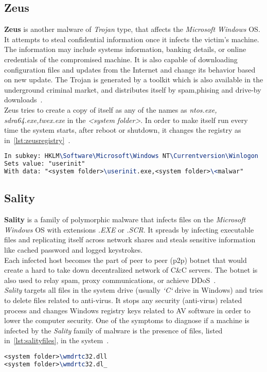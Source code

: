\subsection{Zeus}
\label{sub:Zeus}
\textbf{Zeus} is another malware of \emph{Trojan} type, that affects the \emph{Microsoft Windows} OS\@.
It attempts to steal confidential information once it infects the victim's machine.
The information may include systems information, banking details, or online credentials of the compromised machine.
It is also capable of downloading configuration files and updates from the Internet and change its behavior based on new update.
The Trojan is generated by a toolkit which is also available in the underground criminal market, and distributes itself by spam,phising and drive-by downloads~\cite[Trojan.Zbot]{zeus}.\\
Zeus tries to create a copy of itself as any of the names as \emph{ntos.exe, sdra64.exe,twex.exe} in the \textit{<system folder>}.
In order to make itself run every time the system starts, after reboot or shutdown, it changes the registry as in~\autoref{lst:zeusregistry}~\cite[Win32/Zbot]{zeusmicro}.
\begin{lstlisting}[language=TeX,caption={Registry key modified by Zeus Trojan to autostart},label={lst:zeusregistry}]
In subkey: HKLM\Software\Microsoft\Windows NT\Currentversion\Winlogon
Sets value: "userinit"
With data: "<system folder>\userinit.exe,<system folder>\<malwar"
\end{lstlisting}
\subsection{Sality}
\label{sub:Sality}
\textbf{Sality} is a family of polymorphic malware that infects files on the \emph{Microsoft Windows} OS with extensions \emph{.EXE} or \emph{.SCR}.
It spreads by infecting executable files and replicating itself across network shares and steals sensitive information like cached password and logged keystrokes.\\
Each infected host becomes the part of peer to peer (p2p) botnet that would create a hard to take down decentralized network of C\&C servers.
The botnet is also used to relay spam, proxy communications, or achieve DDoS~\cite[Sality]{salitysym}.\\
\emph{Sality} targets all files in the system drive (usually \emph{`C`} drive in Windows) and tries to delete files related to anti-virus.
It stops any security (anti-virus) related process  and changes Windows registry keys related to AV software in order to lower the computer security.
One of the symptoms to diagnose if a machine is infected by the \emph{Sality} family of malware is the presence of files, listed in~\autoref{lst:salityfiles}, in the system~\cite[Win32/Sality]{salitymicro}.
\begin{lstlisting}[language=TeX,caption={Files created by Sality in the infected machine},label={lst:salityfiles}]
<system folder>\wmdrtc32.dll
<system folder>\wmdrtc32.dl_
\end{lstlisting}
